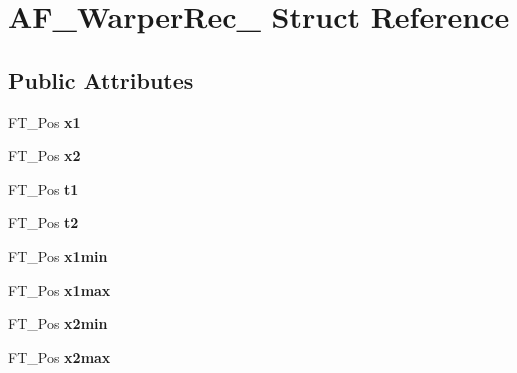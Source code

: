 \hypertarget{struct_a_f___warper_rec__}{}\section{A\+F\+\_\+\+Warper\+Rec\+\_\+ Struct Reference}
\label{struct_a_f___warper_rec__}
\subsection*{Public Attributes}
\begin{DoxyCompactItemize}
\item 
\mbox{\label{struct_a_f___warper_rec___a1d6504ad69987429482b51dd0f15263d}} 
F\+T\+\_\+\+Pos {\bfseries x1}
\item 
\mbox{\label{struct_a_f___warper_rec___ad8645166b145a3ec53e814c5e30837df}} 
F\+T\+\_\+\+Pos {\bfseries x2}
\item 
\mbox{\label{struct_a_f___warper_rec___a8d5476e3dc13752964d5de2927bc2808}} 
F\+T\+\_\+\+Pos {\bfseries t1}
\item 
\mbox{\label{struct_a_f___warper_rec___abd303e10d379e1551d70a94bf2f778a2}} 
F\+T\+\_\+\+Pos {\bfseries t2}
\item 
\mbox{\label{struct_a_f___warper_rec___a32c1bb0ea7f34abca5122fd49ae657cb}} 
F\+T\+\_\+\+Pos {\bfseries x1min}
\item 
\mbox{\label{struct_a_f___warper_rec___a010070e34e7e87d31d71e546041cf691}} 
F\+T\+\_\+\+Pos {\bfseries x1max}
\item 
\mbox{\label{struct_a_f___warper_rec___ab701d8e9dc461f6a8fbc994c44d82448}} 
F\+T\+\_\+\+Pos {\bfseries x2min}
\item 
\mbox{\label{struct_a_f___warper_rec___a596c2b87d56a1673c6b7c165475bac32}} 
F\+T\+\_\+\+Pos {\bfseries x2max}
\item 
\mbox{\label{struct_a_f___warper_rec___a0c083dddb698c6a928f74d4f5ace07b0}} 

\end{DoxyCompactItemize}
